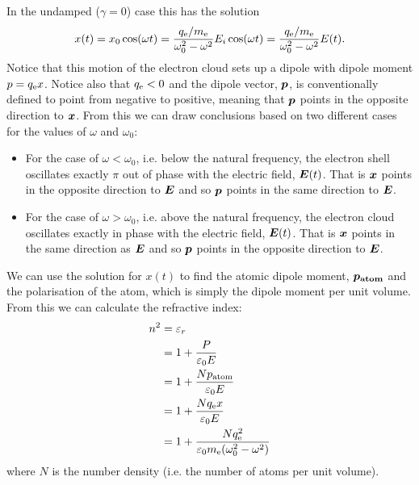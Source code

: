     In the undamped (\(\gamma = 0\)) case this has the solution
    \[x(t) = x_0\cos(\omega t) = \frac{q_{\mathrm{e}}/m_{\mathrm{e}}}{\omega_0^2 - \omega^2}E_i\cos(\omega t) = \frac{q_{\mathrm{e}}/m_{\mathrm{e}}}{\omega_0^2 - \omega^2}E(t).\]
    Notice that this motion of the electron cloud sets up a dipole with dipole moment \(p = q_{\mathrm{e}} x\).
    Notice also that \(q_{\mathrm{e}} < 0\) and the dipole vector, \(\bm{p}\), is conventionally defined to point from negative to positive, meaning that \(\bm{p}\) points in the opposite direction to \(\bm{x}\).
    From this we can draw conclusions based on two different cases for the values of \(\omega\) and \(\omega_0\):
    \begin{itemize}
        \item For the case of \(\omega < \omega_0\), i.e. below the natural frequency, the electron shell oscillates exactly \(\pi\) out of phase with the electric field, \(\bm{E}(t)\).
        That is \(\bm{x}\) points in the opposite direction to \(\bm{E}\) and so \(\bm{p}\) points in the same direction to \(\bm{E}\).
        
        \item For the case of \(\omega > \omega_0\), i.e. above the natural frequency, the electron cloud oscillates exactly in phase with the electric field, \(\bm{E}(t)\).
        That is \(\bm{x}\) points in the same direction as \(\bm{E}\) and so \(\bm{p}\) points in the opposite direction to \(\bm{E}\).
    \end{itemize}
    We can use the solution for \(x(t)\) to find the atomic dipole moment, \(\bm{p_{\mathrm{atom}}}\) and the polarisation of the atom, which is simply the dipole moment per unit volume.
    From this we can calculate the refractive index:
    \begin{align*}
        n^2 &= \varepsilon_r\\
        &= 1 + \frac{P}{\varepsilon_0E}\\
        &= 1 + \frac{Np_{\mathrm{atom}}}{\varepsilon_0E}\\
        &= 1 + \frac{Nq_{\mathrm{e}} x}{\varepsilon_0E}\\
        &= 1 + \frac{Nq_{\mathrm{e}}^2}{\varepsilon_0m_{\mathrm{e}} (\omega_0^2 - \omega^2)}
    \end{align*}
    where \(N\) is the number density (i.e. the number of atoms per unit volume).
    
